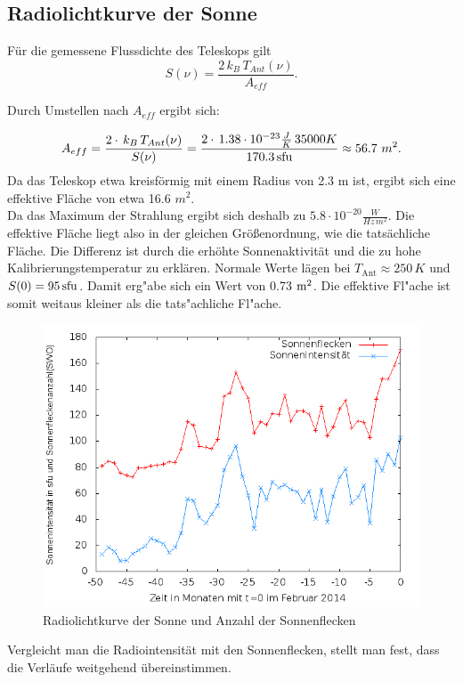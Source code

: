 \subsection{Radiolichtkurve der Sonne}

Für die gemessene Flussdichte des Teleskops gilt
\begin{equation}
S(\nu) = \frac{2 \, k_B \, T_{Ant}(\nu)}{A_{eff}}. 
\end{equation}

Durch Umstellen nach $A_{eff}$ ergibt sich: 

\begin{equation}
A_{eff} = \frac{2 \cdot \, k_B \, T_{Ant}(\nu)}{S(\nu)} = \frac{2 \cdot \, 1.38 \cdot 10^{-23} \frac{J}{K} \, 35000 K}{170.3 \, \mathrm{sfu}}\approx 56.7\  m^2.
\end{equation}
Da das Teleskop etwa kreisförmig mit einem Radius von 2.3 m ist, ergibt sich eine effektive Fläche von etwa 16.6 $m^2$. \\
Da das Maximum der Strahlung ergibt sich deshalb zu $5.8 \cdot 10^{-20} \frac{W}{Hz \, m^2}$.
Die effektive Fläche liegt also in der gleichen Größenordnung, wie die tatsächliche Fläche. Die Differenz ist durch die erhöhte Sonnenaktivität und die zu hohe Kalibrierungstemperatur zu erklären. Normale Werte lägen bei $T_\mathrm{Ant}\approx 250\,K$ und $S(0)=95\,\mathrm{sfu} $. Damit erg"abe sich ein Wert von 0.73 $\mathrm{m}^2$. Die effektive Fl"ache ist somit weitaus kleiner als die tats"achliche Fl"ache.



\begin{figure}
\includegraphics[width=.8\textwidth]{images/sunboth.png}
\caption{ Radiolichtkurve der Sonne und Anzahl der Sonnenflecken}
\label{fig:radioboth}
\end{figure}

Vergleicht man die Radiointensität mit den Sonnenflecken, stellt man fest, dass die Verläufe weitgehend übereinstimmen.